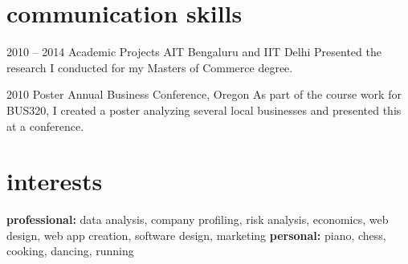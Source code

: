 \documentclass[print]{friggeri-cv} %
\begin{document}

\section{communication skills}

\begin{entrylist}


\entry
{2010 -- 2014}
{Academic Projects}
{AIT Bengaluru and IIT Delhi}
{Presented the research I conducted for my Masters of Commerce degree.}


\entry
{2010}
{Poster}
{Annual Business Conference, Oregon}
{As part of the course work for BUS320, I created a poster analyzing several local businesses and presented this at a conference.}


\end{entrylist}


\section{interests}

\textbf{professional:} data analysis, company profiling, risk analysis, economics, web design, web app creation, software design, marketing \textbf{personal:} piano, chess, cooking, dancing, running


\end{document}
